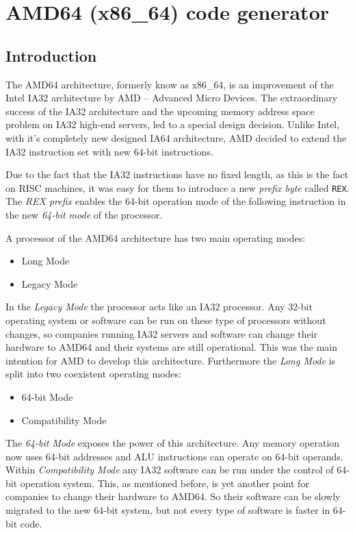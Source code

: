 \section{AMD64 (x86\_64) code generator}

\subsection{Introduction}

The AMD64 architecture, formerly know as x86\_64, is an improvement of
the Intel IA32 architecture by AMD -- Advanced Micro Devices. The
extraordinary success of the IA32 architecture and the upcoming memory
address space problem on IA32 high-end servers, led to a special
design decision. Unlike Intel, with it's completely new designed IA64
architecture, AMD decided to extend the IA32 instruction set with
new 64-bit instructions.

Due to the fact that the IA32 instructions have no fixed length, as
this is the fact on RISC machines, it was easy for them to introduce a
new \textit{prefix byte} called \texttt{REX}. The \textit{REX prefix}
enables the 64-bit operation mode of the following instruction in the
new \textit{64-bit mode} of the processor.

A processor of the AMD64 architecture has two main operating modes:

\begin{itemize}
\item Long Mode
\item Legacy Mode
\end{itemize}

In the \textit{Legacy Mode} the processor acts like an IA32
processor. Any 32-bit operating system or software can be run on these
type of processors without changes, so companies running IA32 servers
and software can change their hardware to AMD64 and their systems are
still operational. This was the main intention for AMD to develop this
architecture. Furthermore the \textit{Long Mode} is split into two
coexistent operating modes:

\begin{itemize}
\item 64-bit Mode
\item Compatibility Mode
\end{itemize}

The \textit{64-bit Mode} exposes the power of this architecture. Any
memory operation now uses 64-bit addresses and ALU instructions can
operate on 64-bit operands. Within \textit{Compatibility Mode} any
IA32 software can be run under the control of 64-bit operation
system. This, as mentioned before, is yet another point for companies
to change their hardware to AMD64. So their software can be slowly
migrated to the new 64-bit system, but not every type of software is
faster in 64-bit code.

